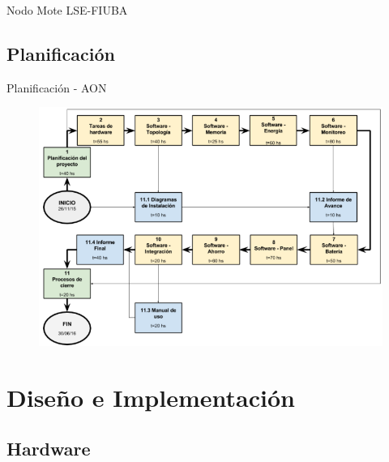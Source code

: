 \documentclass[aspectratio=169, handout]{beamer}
\begin{document}
\begin{frame}{Nodo Mote LSE-FIUBA}
\begin{minipage}[c]{1.0\linewidth}
\begin{minipage}[c]{0.35\linewidth}
\begin{figure}[H]
			\label{Mote LSE}
		\end{figure}	  	  	
	\end{minipage}
\end{minipage}
\end{frame}

\subsection[Plan]{Planificación}
\begin{frame}[t]{Planificación - AON}
		\begin{figure}[H]
			{\includegraphics[width=.73\textwidth]{./imagenes/AON.PNG}}
		\end{figure}	 
\end{frame}

\section{Diseño e Implementación}
\subsection[Hardware]{Hardware}

\end{document}
